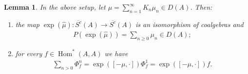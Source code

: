 \documentclass[pdftex]{sigma}
\newcommand{\Hom}{\operatorname{Hom}}
\numberwithin{equation}{section}
\newtheorem{Lemma}[Theorem]{Lemma}
 { \theoremstyle{definition}
\newtheorem{Definition}[Theorem]{Definition}
\newtheorem{Example}[Theorem]{Example}
\newtheorem{Remark}[Theorem]{Remark} }
\begin{document}
\begin{Lemma}\label{lem.exponentialstrange}
In the above setup, let $\mu=\sum\limits_{n=1}^{\infty}K_n\mu_n\in D(A)$. Then:
\begin{enumerate}\itemsep=0pt
\item[$1)$] the map $\exp(\widehat{\mu})\colon \overline{S^c}(A)\to \overline{S^c}(A)$ is an isomorphism of coalgebras and
\begin{gather*} P(\exp(\widehat{\mu}))=\sum_{n\ge 0}\mu_n\in D(A);\end{gather*}
\item[$2)$] for every $f\in\Hom^*(A,A)$ we have
\begin{gather*} \sum_{n>0}\Phi^n_f=\exp([-\mu,\cdot ])\Phi^1_f=\exp([-\mu,\cdot ])f.\end{gather*}
\end{enumerate}
\end{Lemma}
\end{document}
